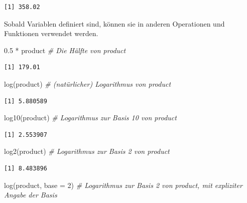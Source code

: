 \documentclass[
  ngerman,
]{scrbook}
\newenvironment{Shaded}{\begin{snugshade}}{\end{snugshade}}
\newcommand{\AttributeTok}[1]{\textcolor[rgb]{0.77,0.63,0.00}{#1}}
\newcommand{\CommentTok}[1]{\textcolor[rgb]{0.56,0.35,0.01}{\textit{#1}}}
\newcommand{\DecValTok}[1]{\textcolor[rgb]{0.00,0.00,0.81}{#1}}
\newcommand{\FloatTok}[1]{\textcolor[rgb]{0.00,0.00,0.81}{#1}}
\newcommand{\FunctionTok}[1]{\textcolor[rgb]{0.00,0.00,0.00}{#1}}
\newcommand{\NormalTok}[1]{#1}
\newcommand{\SpecialCharTok}[1]{\textcolor[rgb]{0.00,0.00,0.00}{#1}}
\begin{document}
\begin{verbatim}
[1] 358.02
\end{verbatim}

Sobald Variablen definiert sind, können sie in anderen Operationen und Funktionen verwendet werden.

\begin{Shaded}
\begin{Highlighting}[]
\FloatTok{0.5} \SpecialCharTok{*}\NormalTok{ product               }\CommentTok{\# Die Hälfte von product}
\end{Highlighting}
\end{Shaded}

\begin{verbatim}
[1] 179.01
\end{verbatim}

\begin{Shaded}
\begin{Highlighting}[]
\FunctionTok{log}\NormalTok{(product)                }\CommentTok{\# (natürlicher) Logarithmus von product}
\end{Highlighting}
\end{Shaded}

\begin{verbatim}
[1] 5.880589
\end{verbatim}

\begin{Shaded}
\begin{Highlighting}[]
\FunctionTok{log10}\NormalTok{(product)              }\CommentTok{\# Logarithmus zur Basis 10 von product}
\end{Highlighting}
\end{Shaded}

\begin{verbatim}
[1] 2.553907
\end{verbatim}

\begin{Shaded}
\begin{Highlighting}[]
\FunctionTok{log2}\NormalTok{(product)               }\CommentTok{\# Logarithmus zur Basis 2 von product}
\end{Highlighting}
\end{Shaded}

\begin{verbatim}
[1] 8.483896
\end{verbatim}

\begin{Shaded}
\begin{Highlighting}[]
\FunctionTok{log}\NormalTok{(product, }\AttributeTok{base =} \DecValTok{2}\NormalTok{)      }\CommentTok{\# Logarithmus zur Basis 2 von product, mit expliziter Angabe der Basis}
\end{Highlighting}
\end{Shaded}
\end{document}

